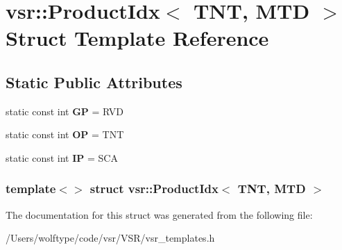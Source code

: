 \hypertarget{structvsr_1_1_product_idx_3_01_t_n_t_00_01_m_t_d_01_4}{\section{vsr\-:\-:Product\-Idx$<$ T\-N\-T, M\-T\-D $>$ Struct Template Reference}
\label{structvsr_1_1_product_idx_3_01_t_n_t_00_01_m_t_d_01_4}
}
\subsection*{Static Public Attributes}
\begin{DoxyCompactItemize}
\item 
\hypertarget{structvsr_1_1_product_idx_3_01_t_n_t_00_01_m_t_d_01_4_aa33334bfa9a32ae9da24b579da0119c5}{static const int {\bfseries G\-P} = R\-V\-D}\label{structvsr_1_1_product_idx_3_01_t_n_t_00_01_m_t_d_01_4_aa33334bfa9a32ae9da24b579da0119c5}

\item 
\hypertarget{structvsr_1_1_product_idx_3_01_t_n_t_00_01_m_t_d_01_4_abe4d393fe5995ac4b9f2ca6a81a64915}{static const int {\bfseries O\-P} = T\-N\-T}\label{structvsr_1_1_product_idx_3_01_t_n_t_00_01_m_t_d_01_4_abe4d393fe5995ac4b9f2ca6a81a64915}

\item 
\hypertarget{structvsr_1_1_product_idx_3_01_t_n_t_00_01_m_t_d_01_4_af5efabc2c82f02d023b0ec65369a85da}{static const int {\bfseries I\-P} = S\-C\-A}\label{structvsr_1_1_product_idx_3_01_t_n_t_00_01_m_t_d_01_4_af5efabc2c82f02d023b0ec65369a85da}

\end{DoxyCompactItemize}
\subsubsection*{template$<$$>$ struct vsr\-::\-Product\-Idx$<$ T\-N\-T, M\-T\-D $>$}



The documentation for this struct was generated from the following file\-:\begin{DoxyCompactItemize}
\item 
/\-Users/wolftype/code/vsr/\-V\-S\-R/vsr\-\_\-templates.\-h\end{DoxyCompactItemize}
